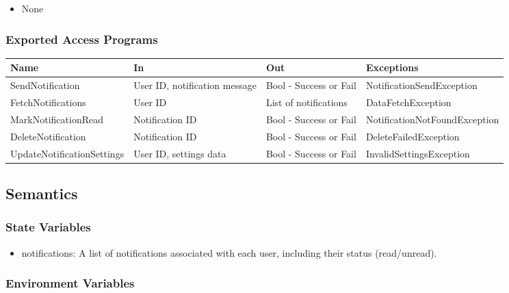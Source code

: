 \documentclass[12pt, titlepage]{article}
\begin{document}
\begin{itemize}
  \item None
\end{itemize}

\subsubsection{Exported Access Programs}

\begin{center}
  \begin{tabular}{p{5cm} p{3cm} p{3cm} p{5cm}}
    \hline
    \textbf{Name}              & \textbf{In}                   & \textbf{Out}           & \textbf{Exceptions}           \\
    \hline
    SendNotification           & User ID, notification message & Bool - Success or Fail & NotificationSendException     \\
    \hline
    FetchNotifications         & User ID                       & List of notifications  & DataFetchException            \\
    \hline
    MarkNotificationRead       & Notification ID               & Bool - Success or Fail & NotificationNotFoundException \\
    \hline
    DeleteNotification         & Notification ID               & Bool - Success or Fail & DeleteFailedException         \\
    \hline
    UpdateNotificationSettings & User ID, settings data        & Bool - Success or Fail & InvalidSettingsException      \\
    \hline
  \end{tabular}
\end{center}

\subsection{Semantics}

\subsubsection{State Variables}

\begin{itemize}
  \item notifications: A list of notifications associated with each user, including their status (read/unread).
\end{itemize}

\subsubsection{Environment Variables}
\end{document}
